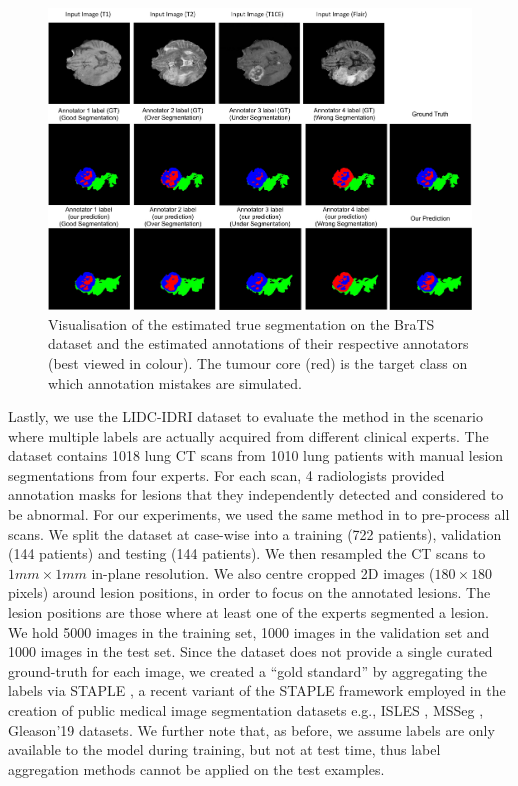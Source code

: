 \begin{figure}[t!]
    \centering
    \includegraphics[width=\linewidth]{chapter_8_neurips/picture8.jpg}
        \caption{\footnotesize Visualisation of the estimated true segmentation on the BraTS dataset and the estimated annotations of their respective annotators (best viewed in colour). The tumour core (red) is the target class on which annotation mistakes are simulated.}
        \label{Brats results}
\end{figure}


Lastly, we use the LIDC-IDRI dataset to evaluate the method in the scenario where multiple labels are actually acquired from different clinical experts. The dataset contains 1018 lung CT scans from 1010 lung patients with manual lesion segmentations from four experts. %
For each scan, 4 radiologists provided annotation masks for lesions that they independently detected and considered to be abnormal. For our experiments, we used the same method in \cite{kohl2018probabilistic} to pre-process all scans. We split the dataset at case-wise into a training (722 patients), validation (144 patients) and testing (144 patients). We then resampled the CT scans to $1 mm \times 1 mm$ in-plane resolution. We also centre cropped 2D images ($180 \times 180$ pixels) around lesion positions, in order to focus on the annotated lesions. The lesion positions are those where at least one of the experts segmented a lesion. We hold 5000 images in the training set, 1000 images in the validation set and 1000 images in the test set. Since the dataset does not provide a single curated ground-truth for each image, we created a ``gold standard'' by aggregating the labels via STAPLE \cite{asman2012formulating}, a recent variant of the STAPLE framework employed in the creation of public medical image segmentation datasets e.g., ISLES \cite{winzeck2018isles}, MSSeg \cite{commowick2018objective}, Gleason'19 \cite{gleason2019} datasets. We further note that, as before, we assume labels are only available to the model during training, but not at test time, thus label aggregation methods cannot be applied on the test examples. 


